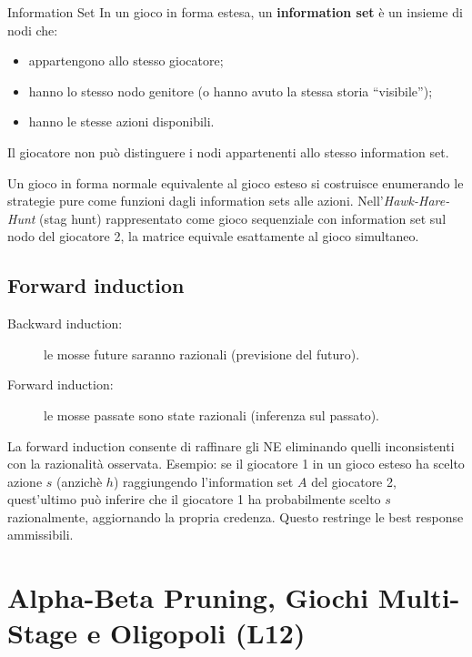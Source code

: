 \documentclass[12pt,a4paper,twoside]{book}
\theoremstyle{plain}
\theoremstyle{definition}
\begin{document}
\begin{defbox}{Information Set}
In un gioco in forma estesa, un \textbf{information set} è un insieme di nodi che:
\begin{itemize}
  \item appartengono allo stesso giocatore;
  \item hanno lo stesso nodo genitore (o hanno avuto la stessa storia ``visibile'');
  \item hanno le stesse azioni disponibili.
\end{itemize}
Il giocatore non può distinguere i nodi appartenenti allo stesso information set.
\end{defbox}

Un gioco in forma normale equivalente al gioco esteso si costruisce enumerando le strategie pure come funzioni dagli information sets alle azioni. Nell'\emph{Hawk-Hare-Hunt} (stag hunt) rappresentato come gioco sequenziale con information set sul nodo del giocatore 2, la matrice equivale esattamente al gioco simultaneo.

\section{Forward induction}

\begin{description}
  \item[Backward induction:] le mosse future saranno razionali (previsione del futuro).
  \item[Forward induction:] le mosse passate sono state razionali (inferenza sul passato).
\end{description}

La forward induction consente di raffinare gli NE eliminando quelli inconsistenti con la razionalità osservata. Esempio: se il giocatore 1 in un gioco esteso ha scelto azione $s$ (anzichè $h$) raggiungendo l'information set $A$ del giocatore 2, quest'ultimo può inferire che il giocatore 1 ha probabilmente scelto $s$ razionalmente, aggiornando la propria credenza. Questo restringe le best response ammissibili.

\chapter{Alpha-Beta Pruning, Giochi Multi-Stage e Oligopoli (L12)}
\label{ch:alpha-beta}
\end{document}
